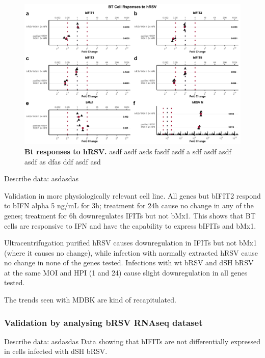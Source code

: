 \begin{figure}
    \centering
    \includegraphics[width=1\linewidth]{07. Chapter 2/Figs/02. Induction/10. bt_hrsv.pdf}
    \caption[Bt responses to hRSV.]{\textbf{Bt responses to hRSV.} asdf asdf asds fasdf asdf a sdf asdf asdf asdf as dfas ddf asdf asd}
    \label{Bt responses to hRSV}
\end{figure}


Describe data: \newline
asdasdas

Validation in more physiologically relevant cell line. All genes but bIFIT2 respond to bIFN alpha 5 ng/mL for 3h; treatment for 24h cause no change in any of the genes; treatment for 6h downregulates IFITs but not bMx1. This shows that BT cells are responsive to IFN and have the capability to express bIFITs and bMx1.

Ultracentrifugation purified hRSV causes downregulation in IFITs but not bMx1 (where it causes no change), while infection with normally extracted hRSV cause no change in none of the genes tested. Infections with wt bRSV and dSH bRSV at the same MOI and HPI (1 and 24) cause slight downregulation in all genes tested.

The trends seen with MDBK are kind of recapitulated.

\subsubsection{Validation by analysing bRSV RNAseq dataset} \label{Validation by analysing bRSV RNAseq dataset}
Describe data: \newline
asdasdas \newline
Data showing that bIFITs are not differentially expressed in cells infected with dSH bRSV.

